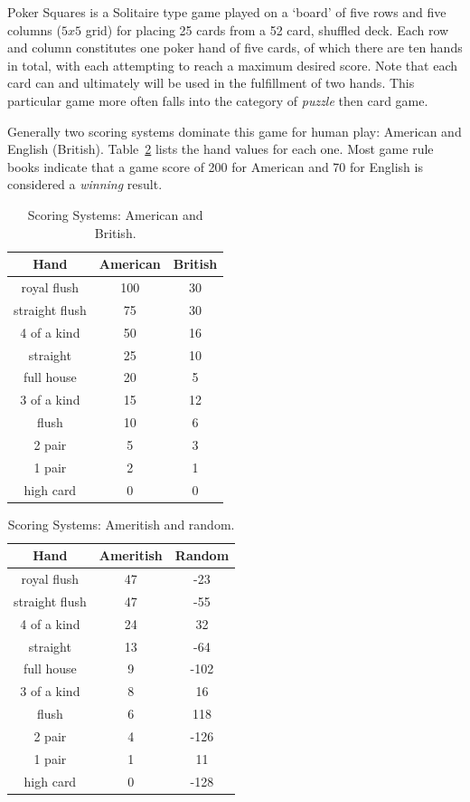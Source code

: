 \documentclass[letterpaper]{article}
\begin{document}
Poker Squares is a Solitaire type game played on a `board' of five rows and five columns ($5 x 5$ grid) for placing 25 cards from a 52 card, shuffled deck. Each row and column constitutes one poker hand of five cards, of which there are ten hands in total, with each attempting to reach a maximum desired score. Note that each card can and ultimately will be used in the fulfillment of two hands. This particular game more often falls into the category of  \emph{puzzle} then card game.

Generally two scoring systems dominate this game for human play: American and English (British). Table~\ref{tbl:SSAMBR} lists the hand values for each one. Most game rule books indicate that a game score of 200 for American and 70 for English is considered a \emph{winning} result.

\begin{table}[b]
\caption{Scoring Systems: American and British.}
\label{tbl:SSAMBR}
\centering
\begin{tabular}{c c c}
\hline
Hand & American & British \\
\hline
royal flush & 100 & 30 \\
straight flush & 75 & 30 \\
4 of a kind & 50 & 16 \\
straight & 25 & 10 \\
full house & 20 & 5 \\
3 of a kind & 15 & 12 \\
flush & 10 & 6 \\
2 pair & 5 & 3 \\
1 pair & 2 & 1 \\
high card & 0 & 0 \\
\hline
\end{tabular}
\end{table}

\begin{table}
\caption{Scoring Systems: Ameritish and random.}
\label{tbl:SSAMBR}
\centering
\begin{tabular}{c c c}
\hline
Hand & Ameritish & Random \\
\hline
royal flush & 47 & -23 \\
straight flush & 47 & -55 \\
4 of a kind & 24 & 32 \\
straight & 13 & -64 \\
full house & 9 & -102 \\
3 of a kind & 8 & 16 \\
flush & 6 & 118 \\
2 pair & 4 & -126 \\
1 pair & 1 & 11 \\
high card & 0 & -128 \\
\hline
\end{tabular}
\end{table}
\end{document}
